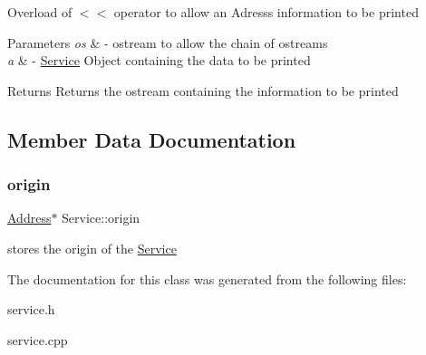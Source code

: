 Overload of $<$$<$ operator to allow an Adress\textquotesingle{}s information to be printed


\begin{DoxyParams}{Parameters}
{\em os} & -\/ ostream to allow the chain of ostreams \\
\hline
{\em a} & -\/ \hyperlink{class_service}{Service} Object containing the data to be printed \\
\hline
\end{DoxyParams}
\begin{DoxyReturn}{Returns}
Returns the ostream containing the information to be printed 
\end{DoxyReturn}


\subsection{Member Data Documentation}
\mbox{\label{class_service_a4abd0a104d97e5bdb8e8ca93bab31ce7}} 
\subsubsection{\texorpdfstring{origin}{origin}}
{\footnotesize\ttfamily \hyperlink{class_address}{Address}$\ast$ Service\+::origin\hspace{0.3cm}{\ttfamily [protected]}}

stores the origin of the \hyperlink{class_service}{Service} 

The documentation for this class was generated from the following files\+:\begin{DoxyCompactItemize}
\item 
service.\+h\item 
service.\+cpp\end{DoxyCompactItemize}

